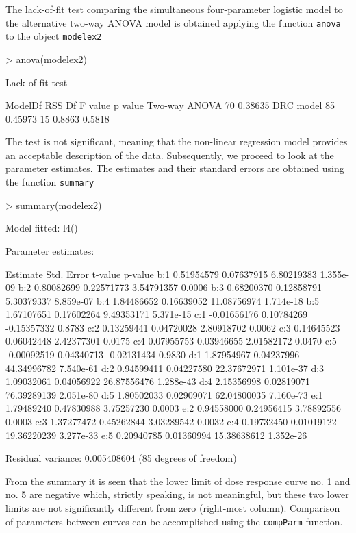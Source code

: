 \documentclass[a4paper]{article}
\begin{document}
The lack-of-fit test comparing the simultaneous four-parameter logistic model to the alternative two-way ANOVA model is obtained applying the
function \verb+anova+ to the object \verb+modelex2+

\begin{Schunk}
\begin{Sinput}
> anova(modelex2)
\end{Sinput}
\begin{Soutput}
Lack-of-fit test

              ModelDf     RSS Df F value p value
Two-way ANOVA      70 0.38635                   
DRC model          85 0.45973 15  0.8863  0.5818
\end{Soutput}
\end{Schunk}
The test is not significant, meaning that the non-linear regression model provides an acceptable description of the data.
Subsequently, we proceed to look at the parameter estimates. The estimates and their standard errors are obtained using the function \verb+summary+

\begin{Schunk}
\begin{Sinput}
> summary(modelex2)
\end{Sinput}
\begin{Soutput}
Model fitted: l4()

Parameter estimates:

       Estimate  Std. Error     t-value   p-value
b:1  0.51954579  0.07637915  6.80219383 1.355e-09
b:2  0.80082699  0.22571773  3.54791357    0.0006
b:3  0.68200370  0.12858791  5.30379337 8.859e-07
b:4  1.84486652  0.16639052 11.08756974 1.714e-18
b:5  1.67107651  0.17602264  9.49353171 5.371e-15
c:1 -0.01656176  0.10784269 -0.15357332    0.8783
c:2  0.13259441  0.04720028  2.80918702    0.0062
c:3  0.14645523  0.06042448  2.42377301    0.0175
c:4  0.07955753  0.03946655  2.01582172    0.0470
c:5 -0.00092519  0.04340713 -0.02131434    0.9830
d:1  1.87954967  0.04237996 44.34996782 7.540e-61
d:2  0.94599411  0.04227580 22.37672971 1.101e-37
d:3  1.09032061  0.04056922 26.87556476 1.288e-43
d:4  2.15356998  0.02819071 76.39289139 2.051e-80
d:5  1.80502033  0.02909071 62.04800035 7.160e-73
e:1  1.79489240  0.47830988  3.75257230    0.0003
e:2  0.94558000  0.24956415  3.78892556    0.0003
e:3  1.37277472  0.45262844  3.03289542    0.0032
e:4  0.19732450  0.01019122 19.36220239 3.277e-33
e:5  0.20940785  0.01360994 15.38638612 1.352e-26

Residual variance: 0.005408604 (85 degrees of freedom)
\end{Soutput}
\end{Schunk}
From the summary it is seen that the lower limit of dose response curve no. 1 and no. 5 are negative which, strictly speaking, is not meaningful,
but these two lower limits are not significantly different from zero (right-most column). Comparison of parameters between curves can
be accomplished using the \verb+compParm+ function.
\end{document}
